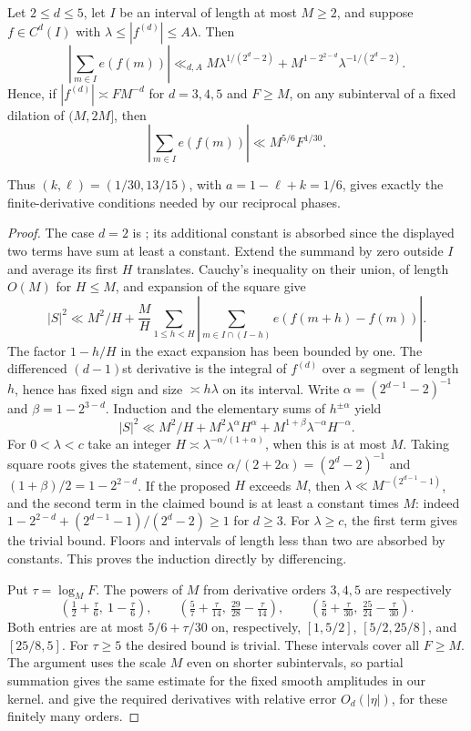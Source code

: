 \begin{lemma}
\label{lem:elementaryderivatives}
Let $2\le d\le5$, let $I$ be an interval of length at most $M\ge2$,
and suppose $f\in C^d(I)$ with
$\lambda\le|f^{(d)}|\le A\lambda$. Then
\[
 \left|\sum_{m\in I}e(f(m))\right|
 \ll_{d,A} M\lambda^{1/(2^d-2)}
   +M^{1-2^{2-d}}\lambda^{-1/(2^d-2)}.
\]
Hence, if $|f^{(d)}|\asymp FM^{-d}$ for $d=3,4,5$ and
$F\ge M$, on any subinterval of a fixed dilation of $(M,2M]$, then
\begin{equation}\label{eq:elementarypair}
 \left|\sum_{m\in I}e(f(m))\right|
 \ll M^{5/6}F^{1/30}.
\end{equation}
\end{lemma}
Thus $(k,\ell)=(1/30,13/15)$, with $a=1-\ell+k=1/6$, gives
exactly the finite-derivative conditions needed by our reciprocal phases.
\begin{proof}
The case $d=2$ is \cite[Lemma~\ref*{six-lem:secondproof}]{Weighted}; its additional constant
is absorbed since the displayed two terms have sum at least a constant.
Extend the summand by zero outside $I$ and average
its first $H$ translates. Cauchy's inequality on their union, of length
$O(M)$ for $H\le M$, and expansion of the square give
\[
 |S|^2\ll M^2/H+\frac MH\sum_{1\le h<H}
 \left|\sum_{m\in I\cap(I-h)}e(f(m+h)-f(m))\right|.
\]
The factor $1-h/H$ in the exact expansion has been bounded by one.
The differenced $(d-1)$st derivative is the integral of $f^{(d)}$
over a segment of length $h$, hence has fixed sign and size
$\asymp h\lambda$ on its interval. Write
$\alpha=(2^{d-1}-2)^{-1}$ and $\beta=1-2^{3-d}$.
Induction and the elementary sums of $h^{\pm\alpha}$ yield
\[
 |S|^2\ll M^2/H+M^2\lambda^\alpha H^\alpha
                   +M^{1+\beta}\lambda^{-\alpha}H^{-\alpha}.
\]
For $0<\lambda<c$ take an integer
$H\asymp\lambda^{-\alpha/(1+\alpha)}$, when this is at most $M$.
Taking square roots gives the statement, since
$\alpha/(2+2\alpha)=(2^d-2)^{-1}$ and
$(1+\beta)/2=1-2^{2-d}$.
If the proposed $H$ exceeds $M$, then
$\lambda\ll M^{-(2^{d-1}-1)}$, and the second term in the claimed
bound is at least a constant times $M$: indeed
$1-2^{2-d}+(2^{d-1}-1)/(2^d-2)\ge1$ for $d\ge3$.
For $\lambda\ge c$, the first term gives the trivial bound.
Floors and intervals of length less than two are absorbed by constants.
This proves the induction directly by differencing.

Put $\tau=\log_MF$. The powers of $M$ from derivative orders $3,4,5$
are respectively
\[
 (\tfrac12+\tfrac\tau6,\ 1-\tfrac\tau6),\qquad
 (\tfrac57+\tfrac\tau{14},\ \tfrac{29}{28}-\tfrac\tau{14}),\qquad
 (\tfrac56+\tfrac\tau{30},\ \tfrac{25}{24}-\tfrac\tau{30}).
\]
Both entries are at most $5/6+\tau/30$ on, respectively,
$[1,5/2]$, $[5/2,25/8]$, and $[25/8,5]$.
For $\tau\ge5$ the desired bound is trivial. These intervals cover
all $F\ge M$. The argument uses the scale $M$ even on shorter
subintervals, so partial summation gives the same estimate for the
fixed smooth amplitudes in our kernel. \cite[Proposition~\ref*{six-prop:exactphaseproof}]{Weighted}
and \cite[Proposition~\ref*{six-prop:tuplemorseproof}]{Weighted} give the required derivatives
with relative error $O_d(|\eta|)$, for these finitely many orders.
\end{proof}


